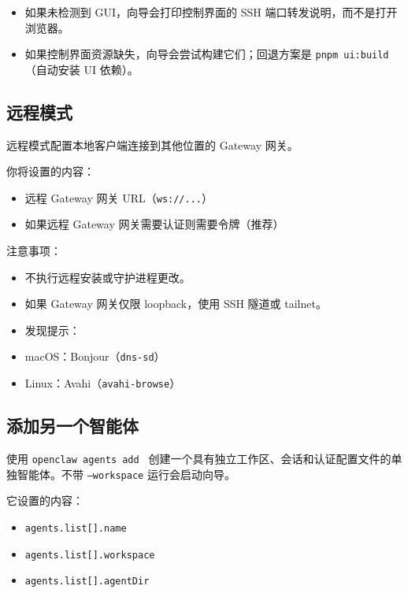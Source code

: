 \begin{itemize}
  \item 如果未检测到 GUI，向导会打印控制界面的 SSH 端口转发说明，而不是打开浏览器。
  \item 如果控制界面资源缺失，向导会尝试构建它们；回退方案是 \texttt{pnpm ui:build}（自动安装 UI 依赖）。
\end{itemize}


\subsection{远程模式}


远程模式配置本地客户端连接到其他位置的 Gateway 网关。

你将设置的内容：

\begin{itemize}
  \item 远程 Gateway 网关 URL（\texttt{ws://...}）
  \item 如果远程 Gateway 网关需要认证则需要令牌（推荐）
\end{itemize}


注意事项：

\begin{itemize}
  \item 不执行远程安装或守护进程更改。
  \item 如果 Gateway 网关仅限 loopback，使用 SSH 隧道或 tailnet。
  \item 发现提示：
  \item macOS：Bonjour（\texttt{dns-sd}）
  \item Linux：Avahi（\texttt{avahi-browse}）
\end{itemize}


\subsection{添加另一个智能体}


使用 \texttt{openclaw agents add } 创建一个具有独立工作区、会话和认证配置文件的单独智能体。不带 \texttt{--workspace} 运行会启动向导。

它设置的内容：

\begin{itemize}
  \item \texttt{agents.list[].name}
  \item \texttt{agents.list[].workspace}
  \item \texttt{agents.list[].agentDir}
\end{itemize}


